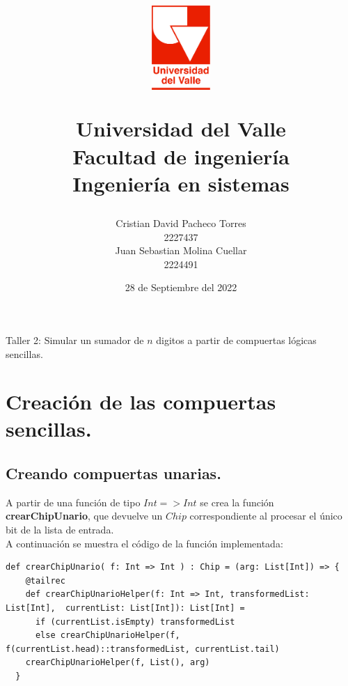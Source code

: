 \documentclass[12pt, a4paper]{article}
\title{
  \begin{figure}[th]
    \centering
    \includegraphics[width=0.2\textwidth]{Univalle}
  \end{figure}
  \textbf{Universidad del Valle
    \\{\Large Facultad de ingeniería}
  \\{\large Ingeniería en sistemas}}}
\author{Cristian David Pacheco Torres
  \\ 2227437
  \\ Juan Sebastian Molina Cuellar
  \\ 2224491}
\date{28 de Septiembre del 2022}
\begin{document}
\maketitle
Taller 2: Simular un sumador de $n$ digitos a partir de compuertas lógicas sencillas.
\newpage{}
\tableofcontents
\newpage{}
\section{Creación de las compuertas sencillas.}
\subsection{Creando compuertas unarias.}
A partir de una función de tipo $Int => Int$ se crea la función \textbf{crearChipUnario}, que devuelve un $Chip$ correspondiente al procesar el único bit de la lista de entrada. \\
A continuación se muestra el código de la función implementada: \\ [16pt]
\begin{lstlisting}[style=scalaStyle, caption=Aplica una operación binaria sobre una valor de entrada.]
  def crearChipUnario( f: Int => Int ) : Chip = (arg: List[Int]) => { 
    @tailrec
    def crearChipUnarioHelper(f: Int => Int, transformedList: List[Int],  currentList: List[Int]): List[Int] =
      if (currentList.isEmpty) transformedList
      else crearChipUnarioHelper(f, f(currentList.head)::transformedList, currentList.tail)
    crearChipUnarioHelper(f, List(), arg)
  }
\end{lstlisting}
\end{document}
